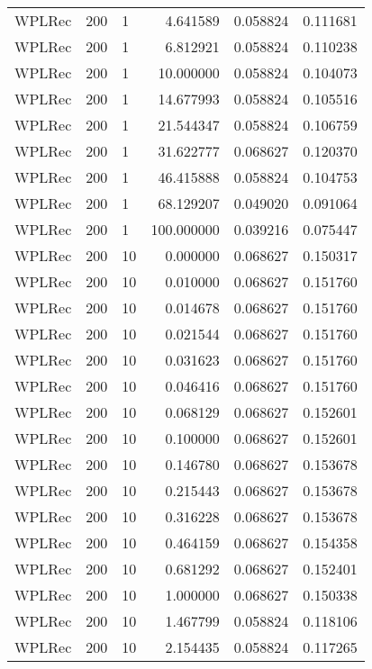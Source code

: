 \begin{tabular}{lllrrr}
 WPLRec &  200 &      1 &    4.641589 &     0.058824 &  0.111681 \\
 WPLRec &  200 &      1 &    6.812921 &     0.058824 &  0.110238 \\
 WPLRec &  200 &      1 &   10.000000 &     0.058824 &  0.104073 \\
 WPLRec &  200 &      1 &   14.677993 &     0.058824 &  0.105516 \\
 WPLRec &  200 &      1 &   21.544347 &     0.058824 &  0.106759 \\
 WPLRec &  200 &      1 &   31.622777 &     0.068627 &  0.120370 \\
 WPLRec &  200 &      1 &   46.415888 &     0.058824 &  0.104753 \\
 WPLRec &  200 &      1 &   68.129207 &     0.049020 &  0.091064 \\
 WPLRec &  200 &      1 &  100.000000 &     0.039216 &  0.075447 \\
 WPLRec &  200 &     10 &    0.000000 &     0.068627 &  0.150317 \\
 WPLRec &  200 &     10 &    0.010000 &     0.068627 &  0.151760 \\
 WPLRec &  200 &     10 &    0.014678 &     0.068627 &  0.151760 \\
 WPLRec &  200 &     10 &    0.021544 &     0.068627 &  0.151760 \\
 WPLRec &  200 &     10 &    0.031623 &     0.068627 &  0.151760 \\
 WPLRec &  200 &     10 &    0.046416 &     0.068627 &  0.151760 \\
 WPLRec &  200 &     10 &    0.068129 &     0.068627 &  0.152601 \\
 WPLRec &  200 &     10 &    0.100000 &     0.068627 &  0.152601 \\
 WPLRec &  200 &     10 &    0.146780 &     0.068627 &  0.153678 \\
 WPLRec &  200 &     10 &    0.215443 &     0.068627 &  0.153678 \\
 WPLRec &  200 &     10 &    0.316228 &     0.068627 &  0.153678 \\
 WPLRec &  200 &     10 &    0.464159 &     0.068627 &  0.154358 \\
 WPLRec &  200 &     10 &    0.681292 &     0.068627 &  0.152401 \\
 WPLRec &  200 &     10 &    1.000000 &     0.068627 &  0.150338 \\
 WPLRec &  200 &     10 &    1.467799 &     0.058824 &  0.118106 \\
 WPLRec &  200 &     10 &    2.154435 &     0.058824 &  0.117265 \\

\end{tabular}
